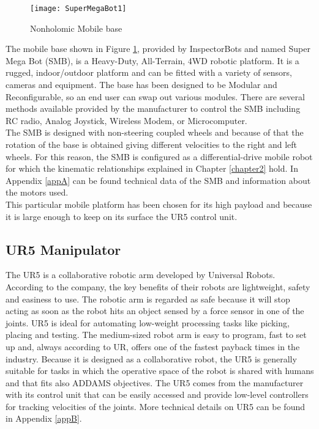 \begin{figure}[h]
\begin{center} 
	\texttt{[image: SuperMegaBot1]}
	\centering
	\caption{Nonholomic Mobile base}
	\label{fig:SuperMegaBot1}
\end{center}
\end{figure}
The mobile base shown in Figure \ref{fig:SuperMegaBot1}, provided by InspectorBots and named Super Mega Bot (SMB), is a Heavy-Duty, All-Terrain, 4WD robotic platform. It is a rugged, indoor/outdoor platform and can be fitted with a variety of sensors, cameras and equipment. The base has been designed to be Modular and Reconfigurable, so an end user can swap out various modules. There are several methods available provided by the manufacturer to control the SMB including RC radio, Analog Joystick, Wireless Modem, or Microcomputer.\\
The SMB is designed with non-steering coupled wheels and because of that the rotation of the base is obtained giving different velocities to the right and left wheels. For this reason, the SMB is configured as a differential-drive mobile robot for which the kinematic relationships explained in Chapter \ref{chapter2} hold. In Appendix \ref{appA} can be found technical data of the SMB and information about the motors used.\\
This particular mobile platform has been chosen for its high payload and because it is large enough to keep on its surface the UR5 control unit.

\subsection{UR5 Manipulator}
The UR5 is a collaborative robotic arm developed by Universal Robots. According to the company, the key benefits of their robots are lightweight, safety and easiness to use. The robotic arm is regarded as safe because it will stop acting as soon as the robot hits an object sensed by a force sensor in one of the joints. UR5 is ideal for automating low-weight processing tasks like picking, placing and testing. The medium-sized robot arm is easy to program, fast to set up and, always according to UR, offers one of the fastest payback times in the industry. Because it is designed as a collaborative robot, the UR5 is generally suitable for tasks in which the operative space of the robot is shared with humans and that fits also ADDAMS objectives. The UR5 comes from the manufacturer with its control unit that can be easily accessed and provide low-level controllers for tracking velocities of the joints. More technical details on UR5 can be found in Appendix \ref{appB}.

